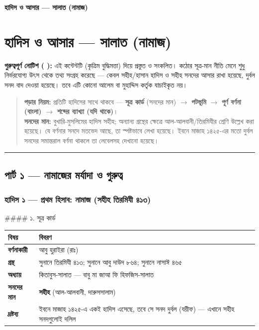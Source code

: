

\begin{center}{\Large\bfseries\color{emerald} হাদিস ও আসার — সালাত (নামাজ)}\end{center}
\vspace{1em}
\section*{হাদিস ও আসার — সালাত (নামাজ)}

\begin{warnbox}
 \textbf{গুরুত্বপূর্ণ নোটিশ ( ):} এই কন্টেন্টটি  (কৃত্রিম বুদ্ধিমত্তা) দিয়ে প্রস্তুত ও সংকলিত।  কঠোর সূত্র-মান নীতি মেনে শুধু নির্ভরযোগ্য উৎস থেকে তথ্য সংগ্রহ করেছে — কেবল সহীহ/হাসান হাদিস ও সহীহ সনদের আসার রাখা হয়েছে, দুর্বল সনদ বাদ দেওয়া হয়েছে। তবে এটি কোনো আলেম বা মুহাদ্দিস কর্তৃক যাচাইকৃত নয়।
\end{warnbox}


\begin{quote}
\textbf{পড়ার নিয়ম:} প্রতিটি হাদিসের সাথে থাকবে — \textbf{সূত্র কার্ড} (সনদের মান) $\rightarrow$ \textbf{পটভূমি} $\rightarrow$ \textbf{পূর্ণ বর্ণনা (বাংলা)} $\rightarrow$ \textbf{শব্দের ব্যাখ্যা (যদি থাকে)}। \\
\textbf{সনদের মান:} বুখারি-মুসলিমের হাদিস সহীহ; অন্যান্য গ্রন্থের ক্ষেত্রে আল-আলবানী/তিরমিযীর শ্রেণি উল্লেখ করা হয়েছে। যে বর্ণনার সনদে মতভেদ আছে, তা স্পষ্টভাবে লেখা হয়েছে। ইবনে মাজাহ ১৪২৫-এর মতো দুর্বল সনদের সমান্তরাল বর্ণনা থাকলে তা লেবেলসহ দেখানো হয়েছে।
\end{quote}


\medskip\hrule\medskip

\subsection*{পার্ট ১ — নামাজের মর্যাদা ও গুরুত্ব}

\subsubsection*{হাদিস ১ — প্রথম হিসাব: নামাজ (সহীহ তিরমিযী ৪১৩)}

\#\#\#\# ১. সূত্র কার্ড

\begin{table}[h]\centering\small
\begin{tabular}{ll}
বিষয় & বিবরণ \\
\hline
\textbf{বর্ণনাকারী} & আবু হুরাইরা (রাঃ) \\
\textbf{গ্রন্থ} & সুনানে তিরমিযী ৪১৩; সুনানে আবু দাউদ ৮৬৪; সুনানে নাসাঈ ৪৬৫ \\
\textbf{অধ্যায়} & কিতাবুস-সালাত — বাবু মা জাআ ফি হিফজিস-সালাত \\
\textbf{সনদের মান} & \textbf{সহীহ} (আল-আলবানী, দারুসসালাম) \\
\textbf{দ্রষ্টব্য} & ইবনে মাজাহ ১৪২৫-এ একই হাদিস এসেছে, তবে সে সনদ দুর্বল (যয়ীফ) — এখানে সহীহ সনদগুলোই দলিল \\
\hline
\end{tabular}
\end{table}

